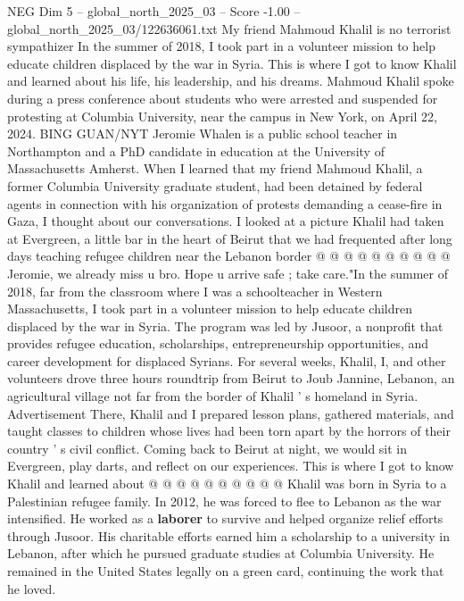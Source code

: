 \begin{textsample}{NEG Dim 5 – global\_north\_2025\_03 – Score -1.00 – global\_north\_2025\_03/122636061.txt}  \label{ex:f5_neg_292}
My friend Mahmoud Khalil is no terrorist sympathizer In the summer of 2018, I took part in a volunteer mission to help educate children displaced by the war in Syria.
This is where I got to know Khalil and learned about his life, his leadership, and his dreams.
Mahmoud Khalil spoke during a press conference about students who were arrested and suspended for protesting at Columbia University, near the campus in New York, on April 22, 2024.
BING GUAN/NYT Jeromie Whalen is a public school teacher in Northampton and a PhD candidate in education at the University of Massachusetts Amherst.
When I learned that my friend Mahmoud Khalil, a former Columbia University graduate student, had been detained by federal agents in connection with his organization of protests demanding a cease-fire in Gaza, I thought about our conversations.
I looked at a picture Khalil had taken at Evergreen, a little bar in the heart of Beirut that we had frequented after long days teaching refugee children near the Lebanon border @ @ @ @ @ @ @ @ @ @ Jeromie, we already miss u bro.
Hope u arrive safe ; take care."In the summer of 2018, far from the classroom where I was a schoolteacher in Western Massachusetts, I took part in a volunteer mission to help educate children displaced by the war in Syria.
The program was led by Jusoor, a nonprofit that provides refugee education, scholarships, entrepreneurship opportunities, and career development for displaced Syrians.
For several weeks, Khalil, I, and other volunteers drove three hours roundtrip from Beirut to Joub Jannine, Lebanon, an agricultural village not far from the border of Khalil ' s homeland in Syria.
Advertisement There, Khalil and I prepared lesson plans, gathered materials, and taught classes to children whose lives had been torn apart by the horrors of their country ' s civil conflict.
Coming back to Beirut at night, we would sit in Evergreen, play darts, and reflect on our experiences.
This is where I got to know Khalil and learned about @ @ @ @ @ @ @ @ @ @ Khalil was born in Syria to a Palestinian refugee family.
In 2012, he was forced to flee to Lebanon as the war intensified.
He worked as a \textbf{laborer} to survive and helped organize relief efforts through Jusoor.
His charitable efforts earned him a scholarship to a university in Lebanon, after which he pursued graduate studies at Columbia University.
He remained in the United States legally on a green card, continuing the work that he loved.

\end{textsample}
